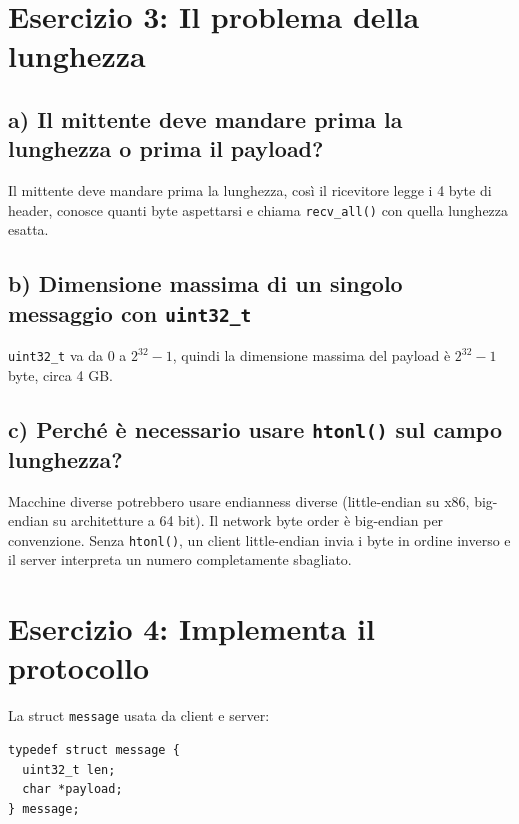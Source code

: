\documentclass[a4paper,12pt]{article}
\begin{document}
\section{Esercizio 3: Il problema della lunghezza}

\subsection{a) Il mittente deve mandare prima la lunghezza o prima il payload?}

Il mittente deve mandare prima la lunghezza, così il ricevitore legge i 4 byte di header,
conosce quanti byte aspettarsi e chiama \texttt{recv\_all()} con quella lunghezza esatta.

\subsection{b) Dimensione massima di un singolo messaggio con \texttt{uint32\_t}}

\texttt{uint32\_t} va da 0 a $2^{32}-1$, quindi la dimensione massima del payload è
$2^{32}-1$ byte, circa 4 GB.

\subsection{c) Perché è necessario usare \texttt{htonl()} sul campo lunghezza?}

Macchine diverse potrebbero usare endianness diverse (little-endian su x86, big-endian su
architetture a 64 bit). Il network byte order è big-endian per convenzione. Senza
\texttt{htonl()}, un client little-endian invia i byte in ordine inverso e il server
interpreta un numero completamente sbagliato.

\section{Esercizio 4: Implementa il protocollo}

La struct \texttt{message} usata da client e server:

\begin{lstlisting}[caption={Struttura message}]
typedef struct message {
  uint32_t len;
  char *payload;
} message;
\end{lstlisting}
\end{document}
